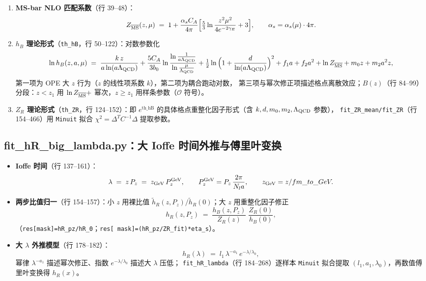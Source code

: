 \documentclass[UTF8,11pt]{ctexart}
\begin{document}
\begin{enumerate}
  \item \textbf{MS-bar NLO 匹配系数}（行 39--48）：
  \begin{equation}
    \label{eq:zms}
    Z_{\overline{\rm MS}}(z,\mu)\;=\;1+\frac{\alpha_s C_A}{4\pi}
    \Big[\tfrac53 \ln\frac{z^2\mu^2}{4e^{-2\gamma_E}} + 3\Big],
    \qquad \alpha_s=\alpha_s(\mu)\cdot 4\pi.
  \end{equation}
  \item \textbf{$h_B$ 理论形式}（\texttt{th\_hB}，行 50--122）：对数参数化
  \begin{equation}
    \ln h_B(z,a,\mu)\;=\;
    \frac{k\,z}{a\ln(a\Lambda_{\rm QCD})}
    + \frac{5C_A}{3b_0}\ln\frac{\ln\frac1{a\Lambda_{\rm QCD}}}{\ln\frac{\mu}{\Lambda_{\rm QCD}}}
    + \tfrac12\ln\Big(1+\frac{d}{\ln(a\Lambda_{\rm QCD})}\Big)^2
    + f_1 a + f_2 a^2 + \ln Z_{\overline{\rm MS}} + m_0 z + m_2 a^2 z,
  \end{equation}
  第一项为 OPE 大 $z$ 行为（$z$ 的线性项系数 $k$），第二项为耦合跑动对数，
  第三项与幂次修正项描述格点离散效应；$B(z)$（行 84--99）分段：$z<z_1$ 用
  $\ln Z_{\overline{\rm MS}}+$ 幂次，$z\ge z_1$ 用样条参数（$\mathcal O$ 符号）。
  \item \textbf{$Z_R$ 理论形式}（\texttt{th\_ZR}，行 124--152）：即 $e^{\text{th\_hB}}$
  的具体格点重整化因子形式（含 $k,d,m_0,m_2,\Lambda_{\rm QCD}$ 参数），
  \texttt{fit\_ZR\_mean/fit\_ZR}（行 154--466）用 \texttt{Minuit} 拟合
  $\chi^2=\Delta^T C^{-1}\Delta$ 提取参数。
\end{enumerate}

\subsection{fit\_hR\_big\_lambda.py：大 Ioffe 时间外推与傅里叶变换}
\label{sec:hR_lambda}

\begin{itemize}
  \item \textbf{Ioffe 时间}（行 137--161）：
  \begin{equation*}
    \lambda \;=\; z\,P_z \;=\; z_{\rm GeV}\, P_z^{\rm GeV},
    \qquad
    P_z^{\rm GeV} = P_z\,\frac{2\pi}{N_l a},
    \qquad z_{\rm GeV} = z/fm\_to\_GeV.
  \end{equation*}
  \item \textbf{两步比值归一}（行 154--157）：小 $z$ 用裸比值
  $\tilde h_R(z,P_z)/\tilde h_R(0)$；大 $z$ 用重整化因子修正
  \begin{equation}
    h_R(z,P_z)\;=\;\frac{h_B(z,P_z)}{Z_R(z)}\;\frac{Z_R(0)}{h_B(0)},
  \end{equation}
  （\texttt{res[mask]=hR\_pz/hR\_0}；\texttt{res[~mask]=(hR\_pz/ZR\_fit)*eta\_s}）。
  \item \textbf{大 $\lambda$ 外推模型}（行 178--182）：
  \begin{equation}
    \label{eq:lamb_form}
    h_R(\lambda)\;=\;l_1\,\lambda^{-a_1}\,e^{-\lambda/\lambda_0},
  \end{equation}
  幂律 $\lambda^{-a_1}$ 描述幂次修正、指数 $e^{-\lambda/\lambda_0}$ 描述大 $\lambda$ 压低；
  \texttt{fit\_hR\_lambda}（行 184--268）逐样本 \texttt{Minuit} 拟合提取
  $(l_1,a_1,\lambda_0)$，再数值傅里叶变换得 $h_R(x)$。
\end{itemize}
\end{document}
